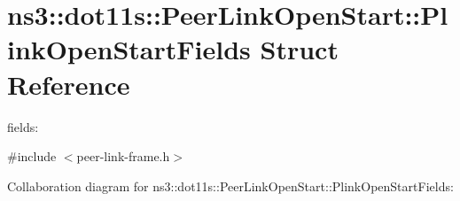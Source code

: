 \hypertarget{structns3_1_1dot11s_1_1PeerLinkOpenStart_1_1PlinkOpenStartFields}{}\section{ns3\+:\+:dot11s\+:\+:Peer\+Link\+Open\+Start\+:\+:Plink\+Open\+Start\+Fields Struct Reference}
\label{structns3_1_1dot11s_1_1PeerLinkOpenStart_1_1PlinkOpenStartFields}


fields\+:  




{\ttfamily \#include $<$peer-\/link-\/frame.\+h$>$}



Collaboration diagram for ns3\+:\+:dot11s\+:\+:Peer\+Link\+Open\+Start\+:\+:Plink\+Open\+Start\+Fields\+:

